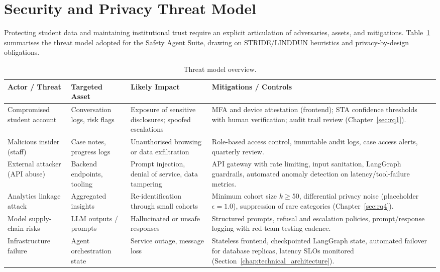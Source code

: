 \section{Security and Privacy Threat Model}
\label{sec:threat_model}

Protecting student data and maintaining institutional trust require an explicit articulation of adversaries, assets, and mitigations. Table~\ref{tab:threat_model} summarises the threat model adopted for the Safety Agent Suite, drawing on STRIDE/LINDDUN heuristics and privacy-by-design obligations.\cite{FIND_CITATION_PLACEHOLDER}

\begin{table}[h]
    \centering
    \caption{Threat model overview.}
    \label{tab:threat_model}
    \begin{tabular}{p{3.0cm}p{3.5cm}p{3.5cm}p{3.5cm}}
        \toprule
        \textbf{Actor / Threat} & \textbf{Targeted Asset} & \textbf{Likely Impact} & \textbf{Mitigations / Controls} \\
        \midrule
        Compromised student account & Conversation logs, risk flags & Exposure of sensitive disclosures; spoofed escalations & MFA and device attestation (frontend); STA confidence thresholds with human verification; audit trail review (Chapter~\ref{sec:rq1}). \\
        Malicious insider (staff) & Case notes, progress logs & Unauthorised browsing or data exfiltration & Role-based access control, immutable audit logs, case access alerts, quarterly review. \\
        External attacker (API abuse) & Backend endpoints, tooling & Prompt injection, denial of service, data tampering & API gateway with rate limiting, input sanitation, LangGraph guardrails, automated anomaly detection on latency/tool-failure metrics. \\
        Analytics linkage attack & Aggregated insights & Re-identification through small cohorts & Minimum cohort size $k\geq50$, differential privacy noise (placeholder $\epsilon=1.0$), suppression of rare categories (Chapter~\ref{sec:rq4}). \\
        Model supply-chain risks & LLM outputs / prompts & Hallucinated or unsafe responses & Structured prompts, refusal and escalation policies, prompt/response logging with red-team testing cadence. \\
        Infrastructure failure & Agent orchestration state & Service outage, message loss & Stateless frontend, checkpointed LangGraph state, automated failover for database replicas, latency SLOs monitored (Section~\ref{chap:technical_architecture}). \\
        \bottomrule
    \end{tabular}
\end{table}

